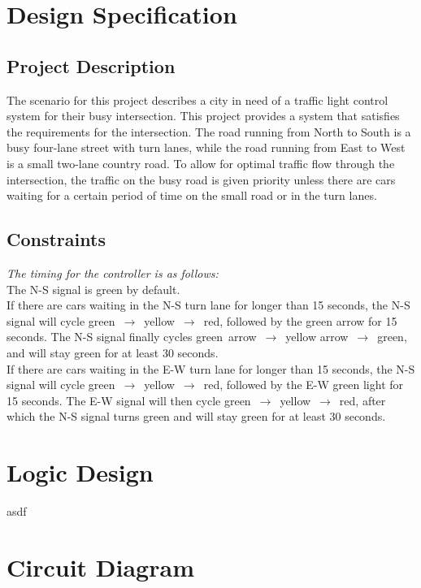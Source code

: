 \section{Design Specification}
\subsection{Project Description}
The scenario for this project describes a city in need of a traffic light control system for their busy intersection.
This project provides a system that satisfies the requirements for the intersection. The road running from North to South is a busy four-lane street with turn lanes,
while the road running from East to West is a small two-lane country road. To allow for optimal traffic flow through the intersection,
the traffic on the busy road is given priority unless there are cars waiting for a certain period of time on the small road or in the turn lanes.

\subsection{Constraints}
\emph{The timing for the controller is as follows:}\\[1cm]
The N-S signal is green by default.\\[5mm]
If there are cars waiting in the N-S turn lane for longer than 15 seconds, the N-S signal will cycle green~$\rightarrow$~yellow~$\rightarrow$~red, followed by the green arrow for 15 seconds.
The N-S signal finally cycles green~arrow~$\rightarrow$~yellow arrow~$\rightarrow$~green, and will stay green for at least 30 seconds.\\[5mm]
If there are cars waiting in the E-W turn lane for longer than 15 seconds, the N-S signal will cycle green~$\rightarrow$~yellow~$\rightarrow$~red, followed by the E-W green light for 15 seconds.
The E-W signal will then cycle green~$\rightarrow$~yellow~$\rightarrow$~red, after which the N-S signal turns green and will stay green for at least 30 seconds.

\section{Logic Design}
asdf

\section{Circuit Diagram}

